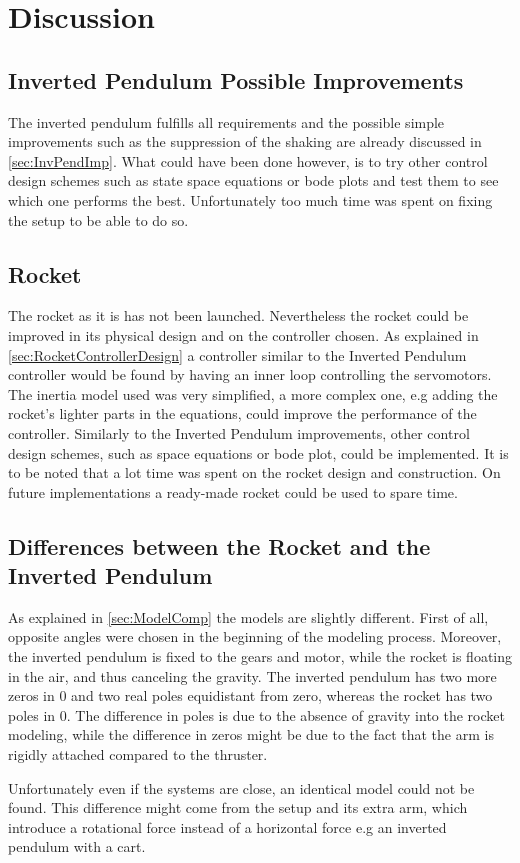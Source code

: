 \chapter{Discussion}\label{sec:Discussion}

\section{Inverted Pendulum Possible Improvements}

The inverted pendulum fulfills all requirements and the possible simple improvements such as the suppression of the shaking are already discussed in \autoref{sec:InvPendImp}. What could have been done however, is to try other control design schemes such as state space equations or bode plots and test them to see which one performs the best. Unfortunately too much time was spent on fixing the setup to be able to do so.

\section{Rocket}

The rocket as it is has not been launched. Nevertheless the rocket could be improved in its physical design and on the controller chosen. As explained in \autoref{sec:RocketControllerDesign} a controller similar to the Inverted Pendulum controller would be found by having an inner loop controlling the servomotors. The inertia model used was very simplified, a more complex one, e.g adding the rocket's lighter parts in the equations, could improve the performance of the controller. Similarly to the Inverted Pendulum improvements, other control design schemes, such as space equations or bode plot, could be implemented. It is to be noted that a lot time was spent on the rocket design and construction. On future implementations a ready-made rocket could be used to spare time.

\section{Differences between the Rocket and the Inverted Pendulum}

As explained in \autoref{sec:ModelComp} the models are slightly different. First of all, opposite angles were chosen in the beginning of the modeling process. Moreover, the inverted pendulum is fixed to the gears and motor, while the rocket is floating in the air, and thus canceling the gravity. The inverted pendulum has two more zeros in 0 and two real poles equidistant from zero, whereas the rocket has two poles in 0. The difference in poles is due to the absence of gravity into the rocket modeling, while the difference in zeros might be due to the fact that the arm is rigidly attached compared to the thruster.

Unfortunately even if the systems are close, an identical model could not be found. This difference might come from the setup and its extra arm, which introduce a rotational force instead of a horizontal force e.g an inverted pendulum with a cart.